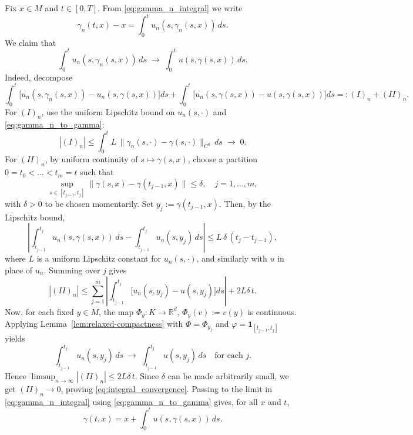 \documentclass[12pt]{amsart}
\numberwithin{equation}{section}
\theoremstyle{remark}
\begin{document}
Fix $x\in M$ and $t\in[0,T]$.
From \eqref{eq:gamma_n_integral} we write
\[
\gamma_n(t,x)-x=\int_0^t u_n(s,\gamma_n(s,x))\,ds.
\]
We claim that
\begin{equation}
\label{eq:integral_convergence}
\int_0^t u_n(s,\gamma_n(s,x))\,ds \;\longrightarrow\; \int_0^t u(s,\gamma(s,x))\,ds.
\end{equation}
Indeed, decompose
\[
\int_0^t \!\!\Big[u_n(s,\gamma_n(s,x))-u_n(s,\gamma(s,x))\Big]ds
+\int_0^t \!\!\Big[u_n(s,\gamma(s,x))-u(s,\gamma(s,x))\Big]ds
=:(I)_n+(II)_n.
\]
For $(I)_n$, use the uniform Lipschitz bound on $u_n(s,\cdot)$ and \eqref{eq:gamma_n_to_gamma}:
\[
|(I)_n|\le \int_0^t L\,\|\gamma_n(s,\cdot)-\gamma(s,\cdot)\|_{C^0}\,ds\;\longrightarrow\;0.
\]
For $(II)_n$,  by uniform continuity of $s\mapsto \gamma(s,x)$, choose a partition
$0=t_0<\dots<t_m=t$ such that
\begin{equation}
\sup_{s\in[t_{j-1},t_j]} \|\gamma(s,x)-\gamma(t_{j-1},x)\|\le \delta,
\quad j=1,\dots,m,
\end{equation}
with $\delta>0$ to be chosen momentarily. Set $y_j:=\gamma(t_{j-1},x)$.
Then, by the Lipschitz bound,
\begin{equation}
\left|\int_{t_{j-1}}^{t_j} u_n(s,\gamma(s,x))\,ds-\int_{t_{j-1}}^{t_j} u_n(s,y_j)\,ds\right|
\le L\,\delta\,(t_j-t_{j-1}),
\end{equation}
where $L$ is a uniform Lipschitz constant for $u_n(s,\cdot)$, and similarly with $u$ in place of $u_n$.
Summing over $j$ gives
\begin{equation}
|(II)_n|
\le \sum_{j=1}^m\left|\int_{t_{j-1}}^{t_j}\!\!\big[u_n(s,y_j)-u(s,y_j)\big]ds\right|
+2L\delta\,t.
\end{equation}
Now, for each fixed $y\in M$, the map $\Phi_y:K\to\mathbb R^d$, $\Phi_y(v):=v(y)$
is continuous.
Applying Lemma~\ref{lem:relaxed-compactness} with $\Phi=\Phi_{y_j}$ and
$\varphi=\mathbf 1_{[t_{j-1},t_j]}$ yields
\begin{equation}
\int_{t_{j-1}}^{t_j} u_n(s,y_j)\,ds \;\longrightarrow\; \int_{t_{j-1}}^{t_j} u(s,y_j)\,ds
\quad\text{for each }j.
\end{equation}
Hence $\limsup_{n\to\infty}|(II)_n|\le 2L\delta\,t$.
Since $\delta$ can be made arbitrarily small, we get $(II)_n\to 0$, proving
\eqref{eq:integral_convergence}. Passing to the limit in \eqref{eq:gamma_n_integral}
using \eqref{eq:gamma_n_to_gamma} gives, for all $x$ and $t$,
\begin{equation}
\label{eq:gamma_limit_integral}
\gamma(t,x)=x+\int_0^t u(s,\gamma(s,x))\,ds.
\end{equation}
\end{document}
